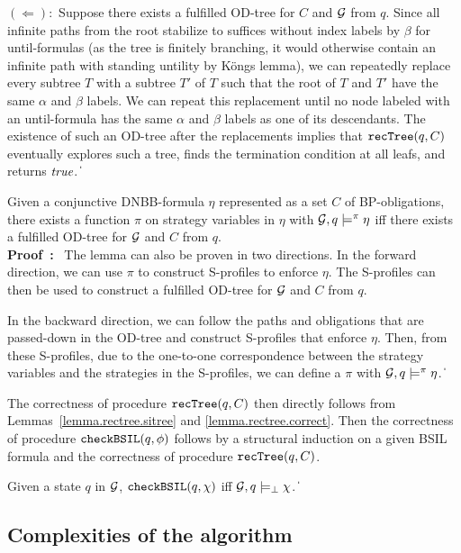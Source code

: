\documentclass[11pt]{article}
\newcommand{\ttchksil}{\mbox{\tt checkBSIL}}
\newcommand{\ttrecsyn}{\mbox{\tt recTree}}
\newcommand{\calg}{{\cal G}}
\newcommand{\true}{\mbox{\em true}}
\newcommand{\pf}{\noindent\mbox{\bf Proof : }}
\def\qed{\ifmmode\|\else{\unskip\nobreak\hfil
\penalty50\hskip1em\null\nobreak\hfil$\blacksquare$
\parfillskip=0pt\finalhyphendemerits=0\endgraf}\fi}
\begin{document}
\noindent $(\Leftarrow):$
Suppose there exists a fulfilled OD-tree for $C$ and $\calg$ from $q$.
Since all infinite paths from the root stabilize to suffices
without index labels by $\beta$ for until-formulas (as the tree is finitely branching, it would otherwise contain an infinite path with standing untility by K\"ongs lemma),
we can repeatedly replace every subtree $T$ with a subtree $T'$ of $T$
such that the root of $T$ and $T'$ have the same $\alpha$ and $\beta$
labels.
We can repeat this replacement until no node labeled with 
an until-formula has the same $\alpha$ and $\beta$ labels as
one of its descendants.
The existence of such an OD-tree after the replacements
implies that $\ttrecsyn(q,C)$ eventually
explores such a tree, finds the termination condition at all leafs,
and returns $\true$.
\qed 



{\lemma \label{lemma.rectree.correct}
Given a conjunctive DNBB-formula $\eta$ represented 
as a set $C$ of BP-obligations, 
there exists a function $\pi$ on strategy variables in $\eta$ 
with $\calg,q\models^\pi \eta$ iff
there exists a fulfilled OD-tree for $\calg$ and $C$ from $q$.
}
\\\pf
The lemma can also be proven in two directions. 
In the forward direction, we can use $\pi$ to construct 
S-profiles to enforce $\eta$. 
The S-profiles can then be used to construct a fulfilled OD-tree 
for $\calg$ and $C$ from $q$. 

In the backward direction, we can follow the paths and 
obligations that are passed-down in the OD-tree and 
construct S-profiles that enforce $\eta$.  
Then, from these S-profiles, due to the one-to-one correspondence %
between the strategy variables and the strategies in the S-profiles, 
we can define a $\pi$ with $\calg,q\models^\pi \eta$.  
% 
\qed 


The correctness of procedure $\ttrecsyn(q,C)$
then directly follows from Lemmas~\ref{lemma.rectree.sitree} and
\ref{lemma.rectree.correct}.
Then the correctness of procedure
$\ttchksil(q,\phi)$ follows by a structural induction on a given BSIL formula
and the correctness of procedure
$\ttrecsyn(q,C)$.

{\lemma \label{lemma.alg.correct}
Given a state $q$ in $\calg$, 
$\ttchksil(q,\chi)$
iff
$\calg,q\models_\perp \chi$.
}
\qed


\subsection{Complexities of the algorithm \label{subsec.alg.pspace}}
\end{document}
